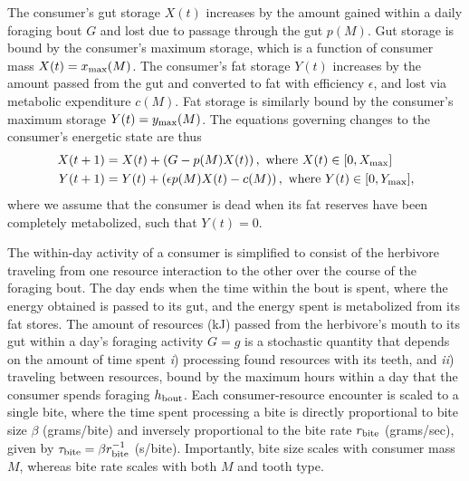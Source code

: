 \documentclass[onecolumn,preprintnumbers,amsmath,amssymb,superscriptaddress]{revtex4}
\begin{document}
The consumer's gut storage $X(t)$ increases by the amount gained within a daily foraging bout $G$ and lost due to passage through the gut $p(M)$.
Gut storage is bound by the consumer's maximum storage, which is a function of consumer mass $X(t) = x_{\rm max}(M)$.
The consumer's fat storage $Y(t)$ increases by the amount passed from the gut and converted to fat with efficiency $\epsilon$, and lost via metabolic expenditure $c(M)$.
Fat storage is similarly bound by the consumer's maximum storage $Y(t) = y_{\rm max}(M)$.
The equations governing changes to the consumer's energetic state are thus
\begin{align}
    X(t+1) &= X(t) + \left(G - p(M)X(t)\right),~{\rm where}~X(t)\in[0,X_{\rm max}] \nonumber \\ 
    Y(t+1) &= Y(t) + \left(\epsilon p(M)X(t) - c(M)\right),~{\rm where}~Y(t)\in[0,Y_{\rm max}], \nonumber
\end{align}
where we assume that the consumer is dead when its fat reserves have been completely metabolized, such that $Y(t) = 0$. 

The within-day activity of a consumer is simplified to consist of the herbivore traveling from one resource interaction to the other over the course of the foraging bout.
The day ends when the time within the bout is spent, where the energy obtained is passed to its gut, and the energy spent is metabolized from its fat stores.
The amount of resources (kJ) passed from the herbivore's mouth to its gut within a day's foraging activity $G = g$ is a stochastic quantity that depends on the amount of time spent \emph{i}) processing found resources with its teeth, and \emph{ii}) traveling between resources, bound by the maximum hours within a day that the consumer spends foraging $h_{\rm bout}$.
Each consumer-resource encounter is scaled to a single bite, where the time spent processing a bite is directly proportional to bite size $\beta$ (grams/bite) and inversely proportional to the bite rate $r_{\rm bite}$ (grams/sec), given by $\tau_{\rm bite} = \beta r_{\rm bite}^{-1}$ (s/bite).
Importantly, bite size scales with consumer mass $M$, whereas bite rate scales with both $M$ and tooth type.
\end{document}
